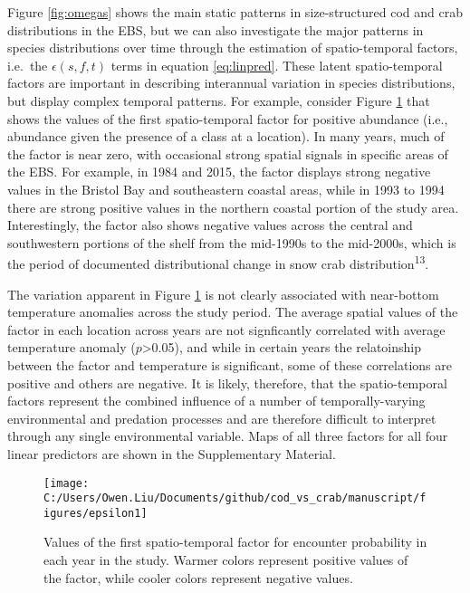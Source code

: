 \documentclass[11pt,]{article}
\begin{document}
Figure \ref{fig:omegas} shows the main static patterns in size-structured cod and crab distributions in the EBS, but we can also investigate the major patterns in species distributions over time through the estimation of spatio-temporal factors, i.e.~the \(\epsilon(s,f,t)\) terms in equation \eqref{eq:linpred}. These latent spatio-temporal factors are important in describing interannual variation in species distributions, but display complex temporal patterns. For example, consider Figure \ref{fig:epsilon} that shows the values of the first spatio-temporal factor for positive abundance (i.e., abundance given the presence of a class at a location). In many years, much of the factor is near zero, with occasional strong spatial signals in specific areas of the EBS. For example, in 1984 and 2015, the factor displays strong negative values in the Bristol Bay and southeastern coastal areas, while in 1993 to 1994 there are strong positive values in the northern coastal portion of the study area. Interestingly, the factor also shows negative values across the central and southwestern portions of the shelf from the mid-1990s to the mid-2000s, which is the period of documented distributional change in snow crab distribution\textsuperscript{13}.

The variation apparent in Figure \ref{fig:epsilon} is not clearly associated with near-bottom temperature anomalies across the study period. The average spatial values of the factor in each location across years are not signficantly correlated with average temperature anomaly (\(p\)\textgreater{}0.05), and while in certain years the relatoinship between the factor and temperature is significant, some of these correlations are positive and others are negative. It is likely, therefore, that the spatio-temporal factors represent the combined influence of a number of temporally-varying environmental and predation processes and are therefore difficult to interpret through any single environmental variable. Maps of all three factors for all four linear predictors are shown in the Supplementary Material.

\begin{figure}
\texttt{[image: C:/Users/Owen.Liu/Documents/github/cod\_vs\_crab/manuscript/figures/epsilon1]} \caption{Values of the first spatio-temporal factor for encounter probability in each year in the study. Warmer colors represent positive values of the factor, while cooler colors represent negative values.}\label{fig:epsilon}
\end{figure}
\end{document}
